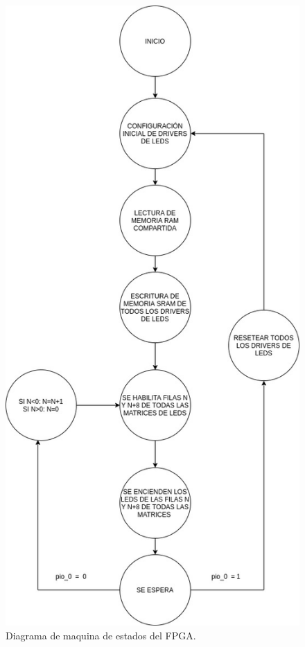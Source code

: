 \begin{figure}[htpb]
	\centering
	\includegraphics[scale=0.5]{Figures/maquinaestados.jpg} 
	\caption{Diagrama de maquina de estados del FPGA.}
	\label{fig: diagrama estados}
\end{figure}







